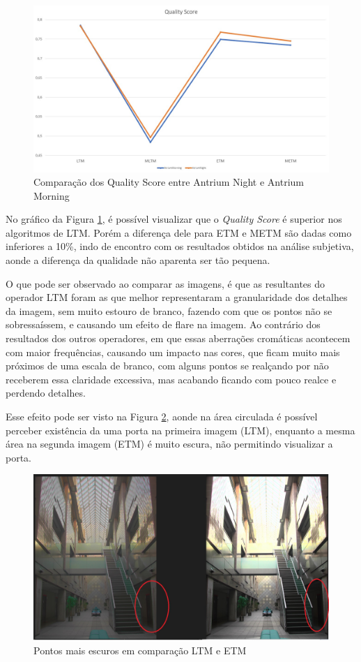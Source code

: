 \documentclass[conference]{IEEEtran}
\begin{document}
\begin{figure}[!htpb]
    \centering
    \includegraphics[scale=.20]{Imagens/comp.jpg}
    \caption{Comparação dos Quality Score entre Antrium Night e Antrium Morning}
    \label{comp}
\end{figure}
No gráfico da Figura \ref{comp}, é possível visualizar que o \textit{Quality Score} é superior nos algoritmos de LTM. Porém a diferença dele para ETM e METM são dadas como inferiores a 10\%, indo de encontro com os resultados obtidos na análise subjetiva, aonde a diferença da qualidade não aparenta ser tão pequena.

O que pode ser observado ao comparar as imagens, é que as resultantes do operador LTM foram as que melhor representaram a granularidade dos detalhes da imagem, sem muito estouro de branco, fazendo com que os pontos não se sobressaíssem, e causando um efeito de flare na imagem. Ao contrário dos resultados dos outros operadores, em que essas aberrações cromáticas acontecem com maior frequências, causando um impacto nas cores, que ficam muito mais próximos de uma escala de branco, com alguns pontos se realçando por não receberem essa claridade excessiva, mas acabando ficando com pouco realce e perdendo detalhes.

Esse efeito pode ser visto na Figura \ref{esc}, aonde na área circulada é possível perceber existência da uma porta na primeira imagem (LTM), enquanto a mesma área na segunda imagem (ETM) é muito escura, não permitindo visualizar a porta.

\begin{figure}[!htpb]
    \centering
    \includegraphics[scale=.20]{Imagens/ima.jpg}
    \caption{Pontos mais escuros em comparação LTM e ETM}
    \label{esc}
\end{figure}
\end{document}
